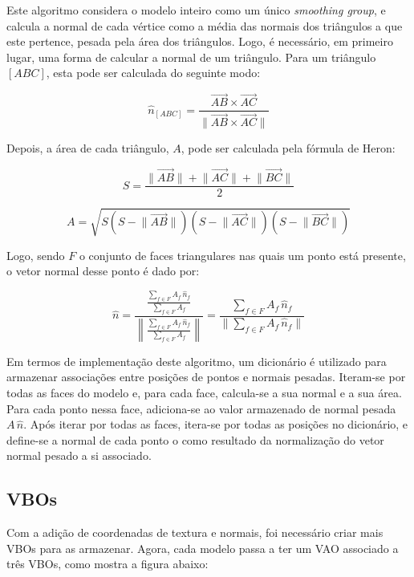 \documentclass[12pt, a4paper]{article}
\begin{document}
Este algoritmo considera o modelo inteiro como um único \emph{smoothing group}, e calcula a normal
de cada vértice como a média das normais dos triângulos a que este pertence, pesada pela área dos
triângulos. Logo, é necessário, em primeiro lugar, uma forma de calcular a normal de um triângulo.
Para um triângulo $[ABC]$, esta pode ser calculada do seguinte modo:

$$
\hat{n}_{[ABC]} = \frac{
    \overrightarrow{AB} \times \overrightarrow{AC}
}{
    \lVert \overrightarrow{AB} \times \overrightarrow{AC} \rVert
}
$$

Depois, a área de cada triângulo, $A$, pode ser calculada pela fórmula de Heron:

$$
S = \frac{
    \lVert \overrightarrow{AB} \rVert +
    \lVert \overrightarrow{AC} \rVert +
    \lVert \overrightarrow{BC} \rVert
}{
    2
}
$$

$$
A = \sqrt{
    S
    \left ( S - \lVert \overrightarrow{AB} \rVert \right )
    \left ( S - \lVert \overrightarrow{AC} \rVert \right )
    \left ( S - \lVert \overrightarrow{BC} \rVert \right )
}
$$

Logo, sendo $F$ o conjunto de faces triangulares nas quais um ponto está presente, o vetor normal
desse ponto é dado por:

$$
\hat{n} =
\frac{
    \frac{
        \sum_{f \in F} {A_f \, \hat{n}_f}
    }{
        \sum_{f \in F} {A_f}
    }
}{
    \left \lVert
    \frac{
        \sum_{f \in F} {A_f \, \hat{n}_f}
    }{
        \sum_{f \in F} {A_f}
    }
    \right \rVert
}
=
\frac{
    \sum_{f \in F} {A_f \, \hat{n}_f}
}{
    \lVert \sum_{f \in F} {A_f \, \hat{n}_f} \rVert
}
$$

Em termos de implementação deste algoritmo, um dicionário é utilizado para armazenar associações
entre posições de pontos e normais pesadas. Iteram-se por todas as faces do modelo e, para cada
face, calcula-se a sua normal e a sua área. Para cada ponto nessa face, adiciona-se ao valor
armazenado de normal pesada $A \, \hat{n}$. Após iterar por todas as faces, itera-se por todas as
posições no dicionário, e define-se a normal de cada ponto o como resultado da normalização do vetor
normal pesado a si associado.

\subsection{VBOs}

Com a adição de coordenadas de textura e normais, foi necessário criar mais VBOs para as armazenar.
Agora, cada modelo passa a ter um VAO associado a três VBOs, como mostra a figura abaixo:
\end{document}
